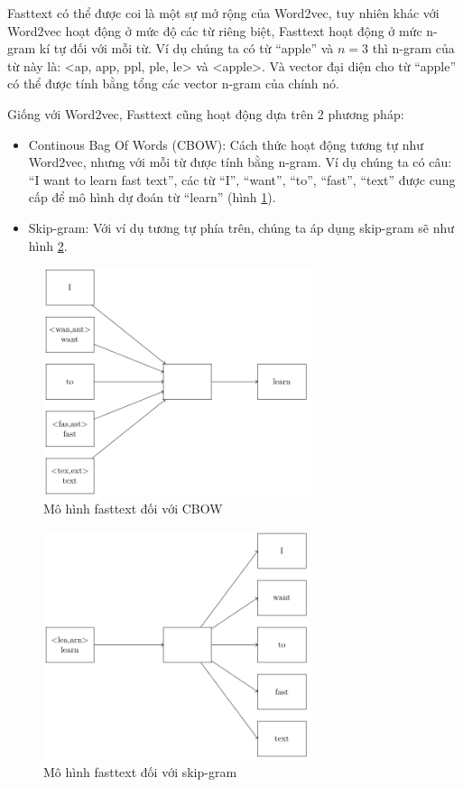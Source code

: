 \begin{sloppypar}
    Fasttext có thể được coi là một sự mở rộng của Word2vec, tuy nhiên khác với Word2vec hoạt động ở mức độ các từ riêng biệt, Fasttext hoạt động ở mức n-gram kí tự đối với mỗi từ. Ví dụ chúng ta có từ ``apple'' và $n = 3$ thì n-gram của từ này là: <ap, app, ppl, ple, le> và <apple>. Và vector đại diện cho từ ``apple'' có thể được tính bằng tổng các vector n-gram của chính nó.
\end{sloppypar}
    
Giống với Word2vec, Fasttext cũng hoạt động dựa trên 2 phương pháp:
\begin{itemize}
    \item Continous Bag Of Words (CBOW): Cách thức hoạt động tương tự như Word2vec, nhưng với mỗi từ được tính bằng n-gram. Ví dụ chúng ta có câu: ``I want to learn fast text'', các từ ``I'', ``want'', ``to'', ``fast'', ``text'' được cung cấp để mô hình dự đoán từ ``learn'' (hình \ref{figure:fasttext-cbow}).
    \item Skip-gram: Với ví dụ tương tự phía trên, chúng ta áp dụng skip-gram sẽ như hình \ref{figure:fasttext-skip-gram}.
\end{itemize}
\begin{figure}[htb!]
    \centering
    \includegraphics[width=0.7\textwidth]{tikz_image/fasttext_cbow.pdf}
    \caption{Mô hình fasttext đối với CBOW \cite{webpage14}}
    \label{figure:fasttext-cbow}
\end{figure}
\begin{figure}[htb!]
    \centering
    \includegraphics[width=0.7\textwidth]{tikz_image/fasttext_skipgram.pdf}
    \caption{Mô hình fasttext đối với skip-gram \cite{webpage14}}
    \label{figure:fasttext-skip-gram}
\end{figure}
